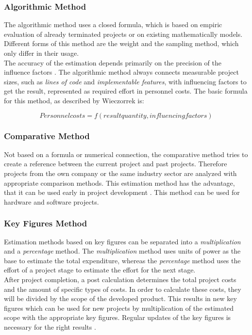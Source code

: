 \subsubsection{Algorithmic Method}

The algorithmic method uses a closed formula, which is based on empiric evaluation of already terminated projects or on existing mathematically models. Different forms of this method are the weight and the sampling method, which only differ in their usage.\\
The accuracy of the estimation depends primarily on the precision of the influence factors \cite{itplanung}. The algorithmic method always connects measurable project sizes, such as \textit{lines of code} and \textit{implementable features}, with influencing factors to get the result, represented as required effort in personnel costs. The basic formula for this method, as described by Wieczorrek \cite{itplanung} is:

\begin{equation}
	Personnel costs = f(result quantity, influencing factors)
\end{equation}

\subsubsection{Comparative Method}

Not based on a formula or numerical connection, the comparative method tries to create a reference between the current project and past projects. Therefore projects from the own company or the same industry sector are analyzed with appropriate comparison methods. This estimation method has the advantage, that it can be used early in project development \cite{itplanung}. This method can be used for hardware and software projects.

\subsubsection{Key Figures Method}

Estimation methods based on key figures can be separated into a \textit{multiplication} and a \textit{percentage} method. The \textit{multiplication} method uses units of power as the base to estimate the total expenditure, whereas the \textit{percentage} method uses the effort of a project stage to estimate the effort for the next stage.\\
After project completion, a post calculation determines the total project costs and the amount of specific types of costs. In order to calculate these costs, they will be divided by the scope of the developed product. This results in new key figures which can be used for new projects by multiplication of the estimated scope with the appropriate key figures. Regular updates of the key figures is necessary for the right results \cite{itplanung}.\\

